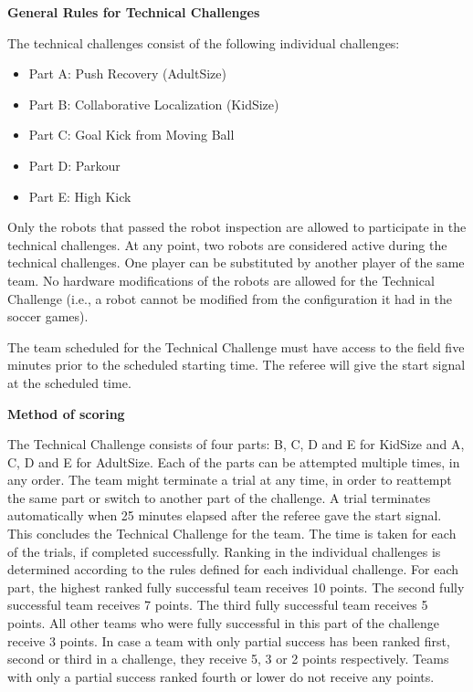 \clearpage
\sffamily
{\bfseries\color[rgb]{0.4,0.4,0.4}
General Rules for Technical Challenges}
{}

\bigskip

The technical challenges consist of the following individual challenges:

\begin{itemize}
\item Part A: Push Recovery (AdultSize)
\item Part B: Collaborative Localization (KidSize)
\item Part C: Goal Kick from Moving Ball
\item Part D: Parkour
\item Part E: High Kick
\end{itemize}

\bigskip

Only the robots that passed the robot inspection are allowed to participate in the technical challenges.
At any point, two robots are considered active during the technical challenges.
One player can be substituted by another player of the same team.
No hardware modifications of the robots are allowed for the Technical Challenge
(i.e., a robot cannot be modified from the configuration it had in the soccer games). 

\bigskip

The team scheduled for the Technical Challenge must have access to the field five minutes prior to the scheduled starting time. The referee will give the start signal at the scheduled time.

\bigskip
{}
{\bfseries Method of scoring}

\headlinebox
 
The Technical Challenge consists of four parts:
  B, C, D and E for KidSize and
  A, C, D and E for AdultSize.
Each of the parts can be attempted multiple times, in any order.
The team might terminate a trial at any time,
in order to reattempt the same part or switch to another part of the challenge.
A trial terminates automatically when 25 minutes elapsed after the referee gave
the start signal.
This concludes the Technical Challenge for the team.
The time is taken for each of the trials, if completed successfully.
Ranking in the individual challenges is determined according to the rules
defined for each individual challenge.
For each part, the highest ranked fully successful team receives 10 points.
The second fully successful team receives 7 points.
The third fully successful team receives 5 points.
All other teams who were fully successful in this part of the challenge receive 3 points.
In case a team with only partial success has been ranked first, second or third in a challenge, they receive 5, 3 or 2 points respectively.
Teams with only a partial success ranked fourth or lower do not receive any points.

